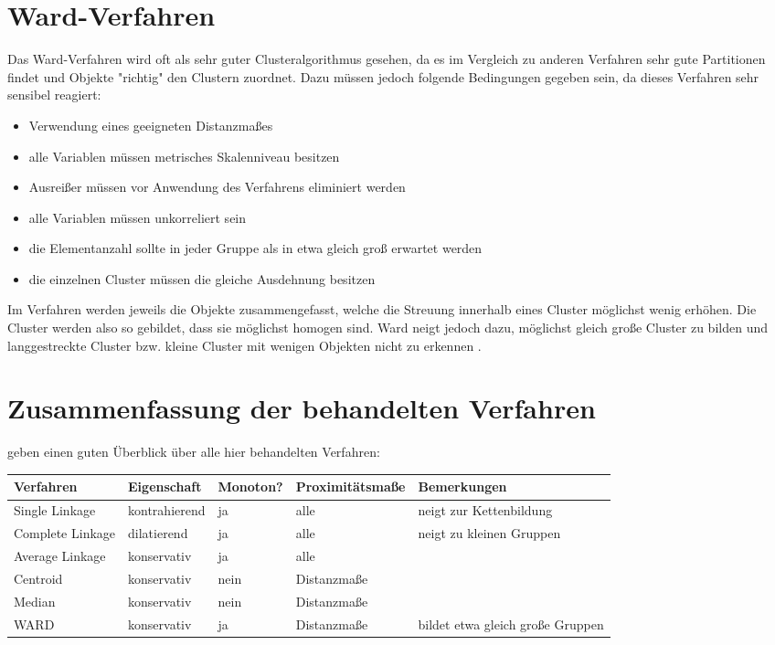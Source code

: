 \section{Ward-Verfahren}
Das Ward-Verfahren wird oft als sehr guter Clusteralgorithmus gesehen, da es im Vergleich zu anderen Verfahren sehr gute Partitionen findet und Objekte "richtig" den Clustern zuordnet. Dazu müssen jedoch folgende Bedingungen gegeben sein, da dieses Verfahren sehr sensibel reagiert: 

\begin{itemize}
	\item Verwendung eines geeigneten Distanzmaßes
	\item alle Variablen müssen metrisches Skalenniveau besitzen
	\item Ausreißer müssen vor Anwendung des Verfahrens eliminiert werden
	\item alle Variablen müssen unkorreliert sein
	\item die Elementanzahl sollte in jeder Gruppe als in etwa gleich groß erwartet werden
	\item die einzelnen Cluster müssen die gleiche Ausdehnung besitzen
\end{itemize}

Im Verfahren werden jeweils die Objekte zusammengefasst, welche die Streuung innerhalb eines Cluster möglichst wenig erhöhen. Die Cluster werden also so gebildet, dass sie möglichst homogen sind. Ward neigt jedoch dazu, möglichst gleich große Cluster zu bilden und langgestreckte Cluster bzw. kleine Cluster mit wenigen Objekten nicht zu erkennen \citep[Vgl.][S. 484]{Backhaus.2016}. \\

\section{Zusammenfassung der behandelten Verfahren}
\citet[S. 489]{Backhaus.2016} geben einen guten Überblick über alle hier behandelten Verfahren: \\

\begin{tabular}{|l|l|l|l|p{3.7cm}|}
	\hline
	\rowcolor{babyblueeyes}Verfahren & Eigenschaft & Monoton? & Proximitätsmaße & Bemerkungen \\ \hline
	\rowcolor{beaublue}Single Linkage & kontrahierend & ja & alle & neigt zur Kettenbildung \\ \hline
	\rowcolor{beaublue}Complete Linkage & dilatierend & ja & alle & neigt zu kleinen Gruppen \\ \hline	
	\rowcolor{beaublue}Average Linkage & konservativ & ja & alle & \\ \hline
	\rowcolor{beaublue}Centroid & konservativ & nein & Distanzmaße & \\ \hline
	\rowcolor{beaublue}Median & konservativ & nein & Distanzmaße & \\ \hline
	\rowcolor{beaublue}WARD & konservativ & ja & Distanzmaße & bildet etwa gleich große Gruppen \\ \hline
\end{tabular}
